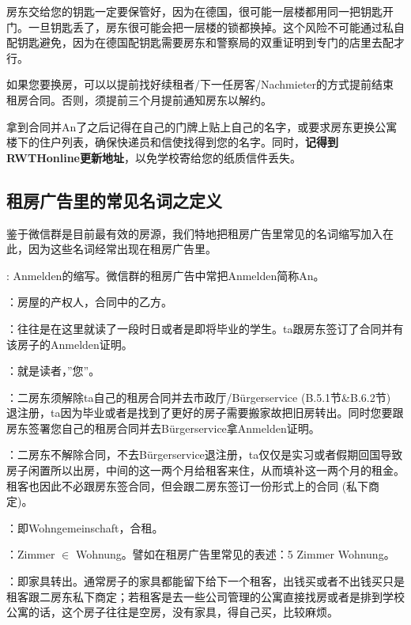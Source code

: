     房东交给您的钥匙一定要保管好，因为在德国，很可能一层楼都用同一把钥匙开门。一旦钥匙丢了，房东很可能会把一层楼的锁都换掉。这个风险不可能通过私自配钥匙避免，因为在德国配钥匙需要房东和警察局的双重证明到专门的店里去配才行。

    如果您要换房，可以以提前找好续租者/下一任房客/Nachmieter的方式提前结束租房合同。否则，须提前三个月提前通知房东以解约。

    拿到合同并An了之后记得在自己的门牌上贴上自己的名字，或要求房东更换公寓楼下的住户列表，确保快递员和信使找得到您的名字。同时，\textbf{记得到RWTHonline更新地址}，以免学校寄给您的纸质信件丢失。

  \subsection{租房广告里的常见名词之定义}\label{subsec:租房广告里的常见名词之定义}

    鉴于微信群是目前最有效的房源，我们特地把租房广告里常见的名词缩写加入在此，因为这些名词经常出现在租房广告里。

    : Anmelden的缩写。微信群的租房广告中常把Anmelden简称An。

    ：房屋的产权人，合同中的乙方。

    ：往往是在这里就读了一段时日或者是即将毕业的学生。ta跟房东签订了合同并有该房子的Anmelden证明。

    ：就是读者，”您”。

    ：二房东须解除ta自己的租房合同并去市政厅/Bürgerservice (B.5.1节\&B.6.2节) 退注册，ta因为毕业或者是找到了更好的房子需要搬家故把旧房转出。同时您要跟房东签署您自己的租房合同并去Bürgerservice拿Anmelden证明。

    ：二房东不解除合同，不去Bürgerservice退注册，ta仅仅是实习或者假期回国导致房子闲置所以出房，中间的这一两个月给租客来住，从而填补这一两个月的租金。租客也因此不必跟房东签合同，但会跟二房东签订一份形式上的合同 (私下商定)。

    ：即Wohngemeinschaft，合租。

    ：Zimmer $\in$ Wohnung。譬如在租房广告里常见的表述：5 Zimmer Wohnung。

    ：即家具转出。通常房子的家具都能留下给下一个租客，出钱买或者不出钱买只是租客跟二房东私下商定；若租客是去一些公司管理的公寓直接找房或者是排到学校公寓的话，这个房子往往是空房，没有家具，得自己买，比较麻烦。


